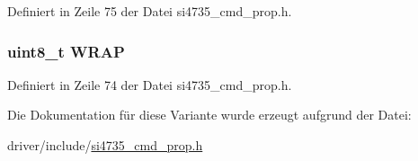 Definiert in Zeile 75 der Datei si4735\+\_\+cmd\+\_\+prop.\+h.

\hypertarget{unionfm__seek__start__arg1_af88f4878136175a8c7ac89aba1be647b}{}
\subsubsection[{W\+R\+A\+P}]{\setlength{\rightskip}{0pt plus 5cm}uint8\+\_\+t W\+R\+A\+P}\label{unionfm__seek__start__arg1_af88f4878136175a8c7ac89aba1be647b}


Definiert in Zeile 74 der Datei si4735\+\_\+cmd\+\_\+prop.\+h.



Die Dokumentation für diese Variante wurde erzeugt aufgrund der Datei\+:\begin{DoxyCompactItemize}
\item 
driver/include/\hyperlink{si4735__cmd__prop_8h}{si4735\+\_\+cmd\+\_\+prop.\+h}\end{DoxyCompactItemize}
